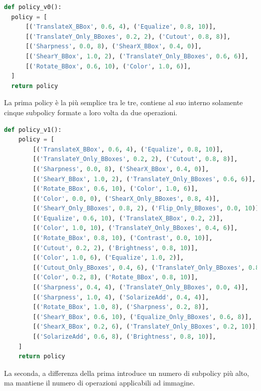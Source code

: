 \begin{lstlisting}[caption={Policy V0 di AutoAugment}, language=Python, basicstyle=\tiny,label=code:policy_v0]
def policy_v0():
  policy = [
      [('TranslateX_BBox', 0.6, 4), ('Equalize', 0.8, 10)],
      [('TranslateY_Only_BBoxes', 0.2, 2), ('Cutout', 0.8, 8)],
      [('Sharpness', 0.0, 8), ('ShearX_BBox', 0.4, 0)],
      [('ShearY_BBox', 1.0, 2), ('TranslateY_Only_BBoxes', 0.6, 6)],
      [('Rotate_BBox', 0.6, 10), ('Color', 1.0, 6)],
  ]
  return policy
\end{lstlisting}
La prima policy è la più semplice tra le tre, contiene al suo interno solamente cinque subpolicy formate a loro volta da due operazioni.
\begin{lstlisting}[caption={Policy V1 di AutoAugment}, language=Python, basicstyle=\tiny,label=code:policy_v1]
def policy_v1():
    policy = [
        [('TranslateX_BBox', 0.6, 4), ('Equalize', 0.8, 10)],
        [('TranslateY_Only_BBoxes', 0.2, 2), ('Cutout', 0.8, 8)],
        [('Sharpness', 0.0, 8), ('ShearX_BBox', 0.4, 0)],
        [('ShearY_BBox', 1.0, 2), ('TranslateY_Only_BBoxes', 0.6, 6)],
        [('Rotate_BBox', 0.6, 10), ('Color', 1.0, 6)],
        [('Color', 0.0, 0), ('ShearX_Only_BBoxes', 0.8, 4)],
        [('ShearY_Only_BBoxes', 0.8, 2), ('Flip_Only_BBoxes', 0.0, 10)],
        [('Equalize', 0.6, 10), ('TranslateX_BBox', 0.2, 2)],
        [('Color', 1.0, 10), ('TranslateY_Only_BBoxes', 0.4, 6)],
        [('Rotate_BBox', 0.8, 10), ('Contrast', 0.0, 10)],
        [('Cutout', 0.2, 2), ('Brightness', 0.8, 10)],
        [('Color', 1.0, 6), ('Equalize', 1.0, 2)],
        [('Cutout_Only_BBoxes', 0.4, 6), ('TranslateY_Only_BBoxes', 0.8, 2)],
        [('Color', 0.2, 8), ('Rotate_BBox', 0.8, 10)],
        [('Sharpness', 0.4, 4), ('TranslateY_Only_BBoxes', 0.0, 4)],
        [('Sharpness', 1.0, 4), ('SolarizeAdd', 0.4, 4)],
        [('Rotate_BBox', 1.0, 8), ('Sharpness', 0.2, 8)],
        [('ShearY_BBox', 0.6, 10), ('Equalize_Only_BBoxes', 0.6, 8)],
        [('ShearX_BBox', 0.2, 6), ('TranslateY_Only_BBoxes', 0.2, 10)],
        [('SolarizeAdd', 0.6, 8), ('Brightness', 0.8, 10)],
    ]
    return policy
\end{lstlisting}
La seconda, a differenza della prima introduce un numero di subpolicy più alto, ma mantiene il numero di operazioni applicabili ad immagine. 

